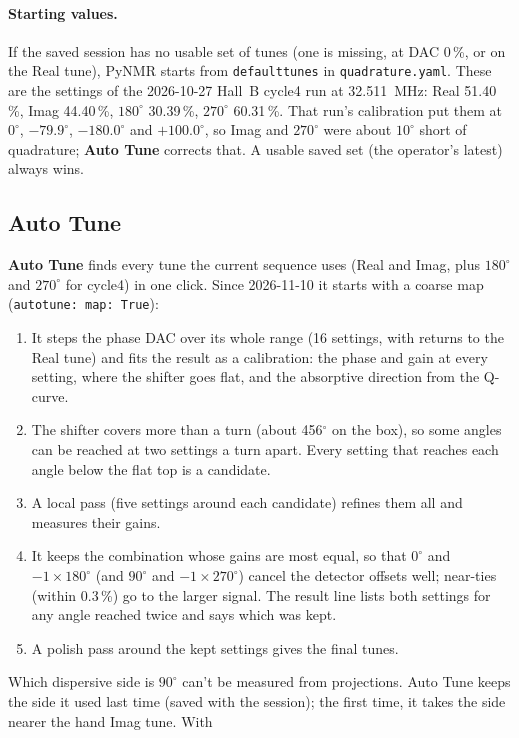 \documentclass[11pt]{article}
\newcommand{\code}[1]{\texttt{\begingroup\def\_{\textunderscore\allowbreak}#1\endgroup}}
\newcommand{\btn}[1]{\textsf{\textbf{#1}}}   %
\begin{document}
\paragraph{Starting values.} If the saved session has no usable set of tunes (one is missing, at DAC 0\,\%, or
on the Real tune), PyNMR starts from \code{default\_tunes} in \code{quadrature.yaml}. These are the settings of
the 2026-10-27 Hall~B cycle4 run at 32.511~MHz: Real 51.40\,\%, Imag 44.40\,\%, $180^\circ$ 30.39\,\%, $270^\circ$
60.31\,\%. That run's calibration put them at $0^\circ$, $-79.9^\circ$, $-180.0^\circ$ and $+100.0^\circ$, so Imag
and $270^\circ$ were about $10^\circ$ short of quadrature; \btn{Auto Tune} corrects that. A usable saved set (the
operator's latest) always wins.

\subsection{Auto Tune}
\label{sec:autotune}
\btn{Auto Tune} finds every tune the current sequence uses (Real and Imag, plus $180^\circ$ and $270^\circ$ for
cycle4) in one click. Since 2026-11-10 it starts with a coarse map (\code{autotune: map: True}):
\begin{enumerate}
\item It steps the phase DAC over its whole range (16 settings, with returns to the Real tune) and fits the result
  as a calibration: the phase and gain at every setting, where the shifter goes flat, and the absorptive
  direction from the Q-curve.
\item The shifter covers more than a turn (about 456$^\circ$ on the box), so some angles can be reached at two
  settings a turn apart. Every setting that reaches each angle below the flat top is a candidate.
\item A local pass (five settings around each candidate) refines them all and measures their gains.
\item It keeps the combination whose gains are most equal, so that $0^\circ$ and $-1\times180^\circ$ (and $90^\circ$
  and $-1\times270^\circ$) cancel the detector offsets well; near-ties (within 0.3\,\%) go to the larger signal.
  The result line lists both settings for any angle reached twice and says which was kept.
\item A polish pass around the kept settings gives the final tunes.
\end{enumerate}
Which dispersive side is $90^\circ$ can't be measured from projections. Auto Tune keeps the side it used last time
(saved with the session); the first time, it takes the side nearer the hand Imag tune. With
\end{document}
